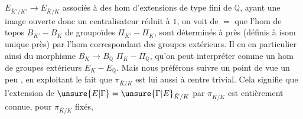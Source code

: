 $E_{\bar K'/K'}\longrightarrow E_{\bar K/K}$ associés à des hom  d'extensions de type fini de $\mathbb Q$, ayant une image ouverte donc un centralisateur réduit à $1$, on voit de $=$ que l'hom de topos $B_{K'}-B_K$  de groupoïdes $\Pi_{K'}-\Pi_K$, sont déterminés à  près (définis à isom unique près) par l'hom correspondant des groupes extérieurs. Il en  en particulier ainsi du morphisme  $B_K\longrightarrow B_{\mathbb Q}$  $\Pi_K-\Pi_{\mathbb Q}$, qu'on peut interpréter  comme un hom de groupes  extérieurs $E_K-E_{\mathbb Q}$. Mais nous préférons suivre un point de vue un peu , en exploitant le fait que $\pi_{\bar K/K}$ est lui aussi à centre trivial. Cela signifie que l'extension de $\unsure{E|\Gamma}=\unsure{\Gamma|E}_{\bar K/K}$ par $\pi_{\bar K/K}$ est entièrement connue,  pour $\pi_{\bar K/K}$  fixés,
